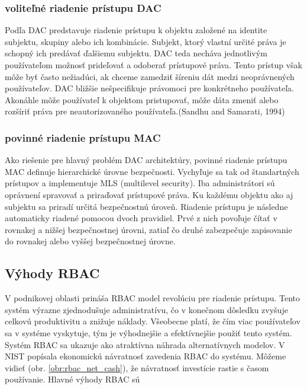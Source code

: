 
\subsubsection{voliteľné riadenie prístupu DAC}
Podľa \cite{} DAC predstavuje riadenie prístupu k objektu založené na identite subjektu, skupiny alebo ich kombinácie. Subjekt, ktorý vlastní určité práva je schopný ich predávať  ďalšiemu subjektu. DAC teda necháva jednotlivým používateľom možnosť prideľovať a odoberať prístupové práva. Tento prístup však môže byť často nežiadúci, ak chceme zamedziť šíreniu dát medzi neoprávnených používateľov. DAC bližšie nešpecifikuje právomoci pre konkrétneho používateľa. Akonáhle môže používateľ k objektom pristupovať, môže dáta zmeniť alebo rozšíriť práva pre neautorizovaného používateľa.(Sandhu and Samarati, 1994)


\subsubsection{povinné riadenie prístupu MAC}
Ako riešenie pre hlavný problém DAC architektúry, povinné riadenie prístupu MAC definuje hierarchické úrovne bezpečnosti. Vychyľuje sa tak od štandartných prístupov a implementuje MLS (multilevel security).  Iba administrátori sú oprávnení  spravovať a priraďovať prístupové práva. Ku každému objektu ako aj subjektu sa priradí určitá bezpečnostnú úroveň. Riadenie prístupu je následne automaticky riadené pomocou dvoch pravidiel. Prvé z nich povoľuje  čítať v rovnakej a nižšej bezpečnostnej úrovni, zatiaľ čo druhé zabezpečuje zapisovanie do rovnakej alebo vyššej bezpečnostnej úrovne. 



\subsection{Výhody RBAC}
V podnikovej oblasti prináša RBAC model revolúciu pre riadenie prístupu. Tento systém výrazne zjednodušuje administratívu, čo v konečnom dôsledku zvyšuje celkovú produktivitu a znižuje náklady.  Všeobecne platí, že čím viac používateľov sa v systéme vyskytuje, tým je výhodnejšie a efektívnejšie použiť tento systém. Systém RBAC sa ukazuje ako atraktívna náhrada alternatívnych modelov. V \cite{ekonomika} NIST popísala ekonomickú návratnosť zavedenia RBAC do systému. Môžeme vidieť (obr. \ref{obr:rbac_net_cash}), že návratnosť investície rastie s časom používanie. Hlavné výhody RBAC sú

